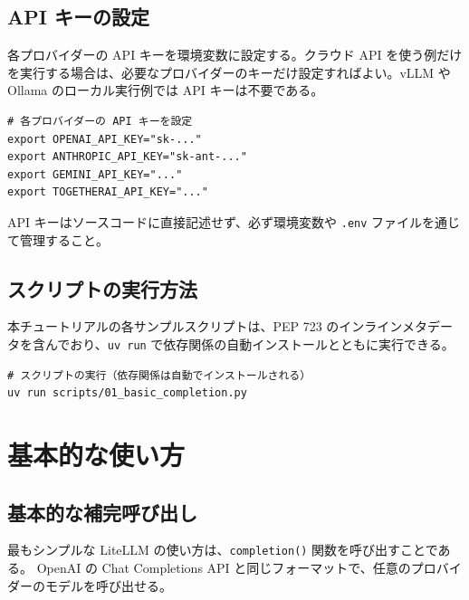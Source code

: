 \documentclass[a4paper,11pt]{ltjsarticle}
\newcommand{\code}[1]{\texttt{#1}}
\begin{document}
\subsection{API キーの設定}

各プロバイダーの API キーを環境変数に設定する。クラウド API を使う例だけを実行する場合は、必要なプロバイダーのキーだけ設定すればよい。vLLM や Ollama のローカル実行例では API キーは不要である。

\begin{lstlisting}[style=bash]
# 各プロバイダーの API キーを設定
export OPENAI_API_KEY="sk-..."
export ANTHROPIC_API_KEY="sk-ant-..."
export GEMINI_API_KEY="..."
export TOGETHERAI_API_KEY="..."
\end{lstlisting}

\begin{warnbox}[注意]
API キーはソースコードに直接記述せず、必ず環境変数や \code{.env} ファイルを通じて管理すること。
\end{warnbox}

\subsection{スクリプトの実行方法}

本チュートリアルの各サンプルスクリプトは、PEP 723 のインラインメタデータを含んでおり、\code{uv run} で依存関係の自動インストールとともに実行できる。

\begin{lstlisting}[style=bash]
# スクリプトの実行（依存関係は自動でインストールされる）
uv run scripts/01_basic_completion.py
\end{lstlisting}


\section{基本的な使い方}
\label{sec:basic}

\subsection{基本的な補完呼び出し}
\label{subsec:basic_completion}

最もシンプルな LiteLLM の使い方は、\code{completion()} 関数を呼び出すことである。
OpenAI の Chat Completions API と同じフォーマットで、任意のプロバイダーのモデルを呼び出せる。


\end{document}
